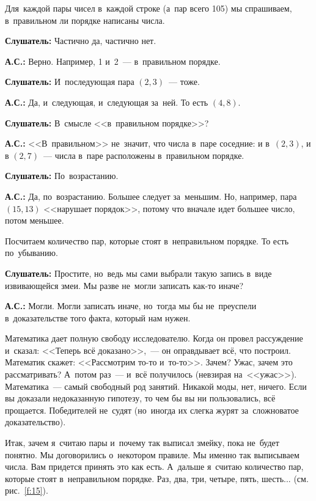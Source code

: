 Для~каждой пары чисел в~каждой строке (а~пар всего 105) мы спрашиваем, в~правильном ли порядке написаны числа.

\textbf{Слушатель:} Частично да, частично нет.

\textbf{А.С.:} Верно. Например, 1 и~2~--- в~правильном порядке.

\textbf{Слушатель:} И~последующая пара $(2,3)$~--- тоже.

\textbf{А.С.:} Да, и~следующая, и~следующая за~ней. То есть $(4,8)$.

\textbf{Слушатель:} В~смысле <<в~правильном порядке>>?

\textbf{А.С.:} <<В~правильном>> не~значит, что числа в~паре соседние: и в~$(2, 3)$, и в $(2, 7)$~---
числа в~паре расположены в~правильном порядке.


\textbf{Слушатель:} По~возрастанию.

\textbf{А.С.:} Да, по~возрастанию. Большее следует за~меньшим. Но, например, пара $(15, 13)$
<<нарушает порядок>>, потому что вначале идет большее число, потом меньшее.

Посчитаем количество пар, которые стоят в~неправильном порядке. То есть по~убыванию.

\textbf{Слушатель:} Простите, но~ведь мы сами выбрали такую запись в~виде извивающейся змеи. Мы разве
не~могли записать как-то иначе?

\textbf{А.С.:} Могли. Могли записать иначе, но~тогда мы бы не~преуспели в~доказательстве того факта, который нам нужен.

\smallskip

{\it

Математика дает полную свободу исследователю. Когда он провел рассуждение и~сказал: <<Теперь всё
доказано>>,~--- он оправдывает всё, что построил. Математик скажет: <<Рассмотрим то-то и~то-то>>. Зачем?
Ужас, зачем это рассматривать? А~потом раз~--- и~всё получилось (невзирая на~<<ужас>>). Математика~---
самый свободный род занятий. Никакой моды, нет, ничего. Если вы доказали недоказанную гипотезу, то
чем бы вы ни пользовались, всё прощается. Победителей не~судят (но~иногда их слегка журят
за~сложноватое доказательство).

Итак, зачем я~считаю пары и~почему так выписал змейку, пока не~будет понятно. Мы договорились
о~некотором правиле. Мы именно так выписываем числа. Вам придется принять это как есть. А~дальше
я~считаю количество пар, которые стоят в~неправильном порядке. Раз, два, три, четыре, пять, шесть...
(см. рис.~\ref{f:15}).

}

